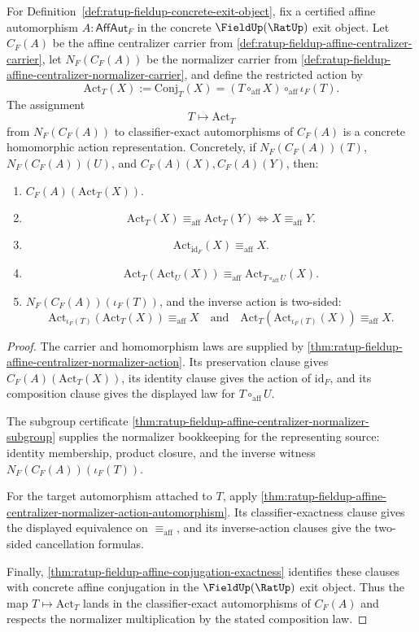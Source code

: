\begin{theorem}
\label{thm:ratup-fieldup-affine-centralizer-normalizer-action-representation}
For Definition~\ref{def:ratup-fieldup-concrete-exit-object}, fix a certified
affine automorphism $A:\mathsf{AffAut}_F$ in the concrete $\FieldUp(\RatUp)$
exit object. Let $C_F(A)$ be the affine centralizer carrier from
\autoref{def:ratup-fieldup-affine-centralizer-carrier}, let $N_F(C_F(A))$ be
the normalizer carrier from
\autoref{def:ratup-fieldup-affine-centralizer-normalizer-carrier}, and define
the restricted action by
$$
\mathrm{Act}_T(X):=\mathrm{Conj}_T(X)
=(T\circ_{\mathrm{aff}}X)\circ_{\mathrm{aff}}\iota_F(T).
$$
The assignment
$$
T\longmapsto \mathrm{Act}_T
$$
from $N_F(C_F(A))$ to classifier-exact automorphisms of $C_F(A)$ is a concrete
homomorphic action representation. Concretely, if
$N_F(C_F(A))(T)$, $N_F(C_F(A))(U)$, and $C_F(A)(X),C_F(A)(Y)$, then:
\begin{enumerate}
\item $C_F(A)(\mathrm{Act}_T(X))$.
\item
$$
\mathrm{Act}_T(X)\equiv_{\mathrm{aff}}\mathrm{Act}_T(Y)
\Longleftrightarrow X\equiv_{\mathrm{aff}}Y.
$$
\item
$$
\mathrm{Act}_{\mathrm{id}_F}(X)\equiv_{\mathrm{aff}}X.
$$
\item
$$
\mathrm{Act}_T(\mathrm{Act}_U(X))\equiv_{\mathrm{aff}}
\mathrm{Act}_{T\circ_{\mathrm{aff}}U}(X).
$$
\item $N_F(C_F(A))(\iota_F(T))$, and the inverse action is two-sided:
$$
\mathrm{Act}_{\iota_F(T)}(\mathrm{Act}_T(X))\equiv_{\mathrm{aff}}X
\quad\text{and}\quad
\mathrm{Act}_T(\mathrm{Act}_{\iota_F(T)}(X))\equiv_{\mathrm{aff}}X.
$$
\end{enumerate}
\end{theorem}
\begin{proof}
The carrier and homomorphism laws are supplied by
\autoref{thm:ratup-fieldup-affine-centralizer-normalizer-action}. Its
preservation clause gives $C_F(A)(\mathrm{Act}_T(X))$, its identity clause gives
the action of $\mathrm{id}_F$, and its composition clause gives the displayed
law for $T\circ_{\mathrm{aff}}U$.

The subgroup certificate
\autoref{thm:ratup-fieldup-affine-centralizer-normalizer-subgroup} supplies the
normalizer bookkeeping for the representing source: identity membership, product
closure, and the inverse witness $N_F(C_F(A))(\iota_F(T))$.

For the target automorphism attached to $T$, apply
\autoref{thm:ratup-fieldup-affine-centralizer-normalizer-action-automorphism}.
Its classifier-exactness clause gives the displayed equivalence on
$\equiv_{\mathrm{aff}}$, and its inverse-action clauses give the two-sided
cancellation formulas.

Finally,
\autoref{thm:ratup-fieldup-affine-conjugation-exactness} identifies these
clauses with concrete affine conjugation in the $\FieldUp(\RatUp)$ exit object.
Thus the map $T\mapsto\mathrm{Act}_T$ lands in the classifier-exact
automorphisms of $C_F(A)$ and respects the normalizer multiplication by the
stated composition law.
\end{proof}

